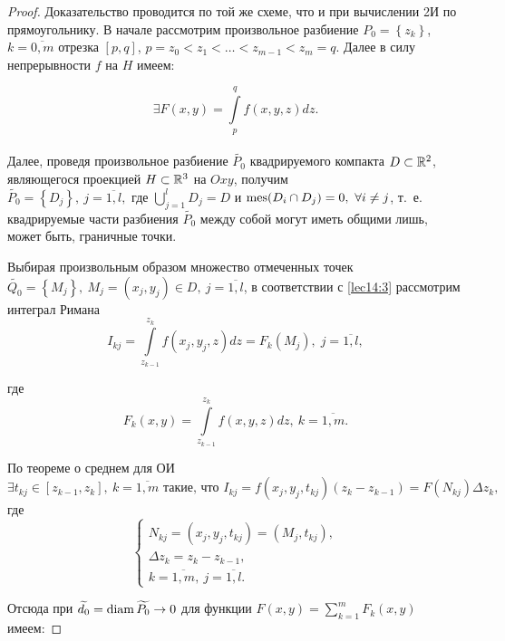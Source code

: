 \documentclass[../../main.tex]{subfiles}
\begin{document}
		
	\begin{proof}
		Доказательство проводится по той же схеме, что и при вычислении 2И по 
		прямоугольнику. В начале рассмотрим произвольное разбиение $P_0 = \left\{ 
		z_k \right\}$, $k = 
		\overline{0, m}$ отрезка $\left[p, q\right]$, $p = z_0 < z_1 < \ldots < z_{m 
		- 1} < z_m = q.$ Далее в силу непрерывности $f$ на $H$ имеем:
		
		\begin{equation}
		\exists F\left(x, y\right) = \int\limits_{p}^{q} f\left(x, y, z\right) dz.
		\label{lec14:3}
		\end{equation}\\
		Далее, проведя произвольное разбиение $\widetilde{P_0}$ квадрируемого 
		компакта $D \subset 
		\mathbb{R}^2$, являющегося проекцией $H \subset \mathbb{R}^3$ на $Oxy$, получим
		$\widetilde{P_0} = \left\{D_j \right\},\ j = \overline{1, l}, \text{ где } 
		\bigcup\limits_{j = 1}^l D_j = D$ и $\operatorname{mes}(D_i \cap D_j) = 0,\ \forall i \neq 
		j$, т.~е. квадрируемые части разбиения $\widetilde{P_0}$ между собой могут 
		иметь общими 
		лишь, может быть, граничные точки.
		
		Выбирая произвольным образом множество отмеченных точек $\widetilde{Q_0} = 
		\left\{ M_j \right\},\ M_j = \left(x_j, y_j\right) \in D,\ j = \overline{1, 
		l}$, в соответствии с \eqref{lec14:3} рассмотрим интеграл Римана
		\begin{equation} 
		I_{kj} = \int\limits_{z_{k-1}}^{z_k} f(x_j, y_j, z)dz = F_k (M_j),\; j = 
		\overline{1, l},  \label{lec14:4}
		\end{equation}
		
		где \[F_k(x, y) = \int\limits_{z_{k - 1}}^{z_k} f\left(x, y, z\right)dz,\ k 
		= 
		\overline{1, m}.\]
		 
		По теореме о среднем для ОИ
		\begin{equation}
			\exists t_{kj} \in \left[z_{k - 1}, z_k 
		\right],\ k = \overline{1, m} \text{ такие, что }
		 	I_{kj} = f(x_j, y_j, t_{kj})\left(z_k - z_{k - 1}\right) = 
		 	F(N_{kj}) \Delta z_k, \label{lec14:5}
		 \end{equation}
		где \[\begin{cases}
		N_{kj} = (x_j, y_j, t_{kj}) = (M_j, t_{kj}),\\
		\Delta z_k = z_k - z_{k - 1}, \\ k = \overline{1, m},\ j = \overline{1, l}.
		\end{cases}\]
		
		Отсюда при $\widetilde{d_0} = \operatorname{diam} \widetilde{P_0} \to 0$ для функции $F(x, 
		y) = \sum\limits_{k = 1}^m F_k(x, y)$ имеем: 
		

\end{proof}
\end{document}
